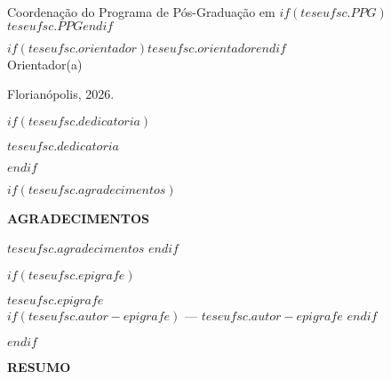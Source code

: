 \begin{center}
\vspace{1em}

Coordenação do Programa de Pós-Graduação em $if(teseufsc.PPG)$$teseufsc.PPG$$endif$

\vspace{3em}

\noindent{}

\vspace{1em}
$if(teseufsc.orientador)$$teseufsc.orientador$$endif$\\
Orientador(a)
\vfill

Florianópolis, 2026.
\end{center}

\newpage{} \thispagestyle{empty}

\onehalfspacing

$if(teseufsc.dedicatoria)$
\vspace*{\fill}
\begin{flushright}
  $teseufsc.dedicatoria$
\end{flushright}
\vspace{1.5em}
$endif$

\newpage{} \thispagestyle{empty}

$if(teseufsc.agradecimentos)$
\begin{center}
\textbf{AGRADECIMENTOS}
\end{center}
\vspace{1.5em}
\onehalfspacing
\indent
\justifying
$teseufsc.agradecimentos$
$endif$

\newpage \thispagestyle{empty}

$if(teseufsc.epigrafe)$
\vspace*{\fill}
\begin{flushright}
  \textit{$teseufsc.epigrafe$}\\
  $if(teseufsc.autor-epigrafe)$
    — $teseufsc.autor-epigrafe$
  $endif$
\end{flushright}
$endif$

\newpage \thispagestyle{empty}

\vspace*{0pt}
\begin{center}
  \textbf{RESUMO}
\end{center}


